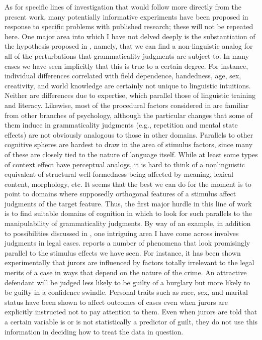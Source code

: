  As for specific lines of investigation that would follow more directly from the present work, many potentially informative experiments have been proposed in response to specific problems with published research; these will not be repeated here. One major area into which I have not delved deeply is the substantiation of the hypothesis proposed in , namely, that we can find a non-linguistic analog for all of the perturbations that grammaticality judgments are subject to. In many cases we have seen implicitly that this is true to a certain degree. For instance, individual differences correlated with field dependence, handedness, age, sex, creativity, and world knowledge are certainly not unique to linguistic intuitions. Neither are differences due to expertise, which parallel those of
 linguistic training and literacy. Likewise, most of the procedural factors considered in  are familiar from other branches of psychology, although the particular changes that some of them induce in grammaticality judgments (e.g., repetition and mental state effects) are not obviously analogous to those in other domains. Parallels to other cognitive spheres are hardest to draw in the area of stimulus factors, since many of these are closely tied to the nature of language itself. While at least some types of context effect have perceptual analogs, it is hard to think of a nonlinguistic equivalent of structural well-formedness being affected by meaning, lexical content, morphology, etc. It seems that the best we can do for the moment is to point to domains where supposedly orthogonal features of a stimulus affect judgments of the target feature. Thus, the first major hurdle in this line of work is to find suitable domains of cognition in which to look for such parallels to the manipulability of grammaticality judgments. By way of an example, in addition to possibilities discussed in , one intriguing area I have come across involves judgments in legal cases. \citet{Kaplan1977}
 reports a number of phenomena that look promisingly parallel to the stimulus effects we have seen. For instance, it has been shown experimentally that jurors are influenced by factors totally irrelevant to the legal merits of a case in ways that depend on the nature of the crime. An attractive defendant will be judged less likely to be guilty of a burglary but more likely to be guilty in a confidence swindle. Personal traits such as race, sex, and marital status have been shown to affect outcomes of cases even when jurors are explicitly instructed not to pay attention to them. Even when jurors are told that a certain variable is or is not statistically a predictor of guilt, they do not use this information in deciding how to treat the data in question.


